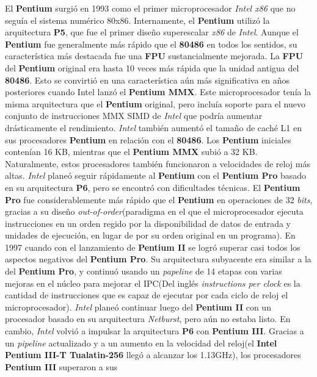 El \textbf{Pentium} surgió en 1993 como el primer microprocesador \emph{Intel x86} que no seguía el sistema numérico 80x86. Internamente, el \textbf{Pentium} utilizó 
la arquitectura \textbf{P5}, que fue el primer diseño superescalar \emph{x86} de \emph{Intel}. Aunque el \textbf{Pentium} fue generalmente más rápido que 
el \textbf{80486} en todos los sentidos, su característica más destacada fue una \textbf{FPU} sustancialmente mejorada. La \textbf{FPU} del \textbf{Pentium} original 
era hasta 10 veces más rápida que la unidad antigua del \textbf{80486}. Esto se convirtió en una característica aún más significativa en años posteriores cuando Intel 
lanzó el \textbf{Pentium MMX}. Este microprocesador tenía la misma arquitectura que el \textbf{Pentium} original, pero incluía soporte para el nuevo conjunto de instrucciones 
MMX SIMD de \emph{Intel} que podría aumentar drásticamente el rendimiento. \emph{Intel} también aumentó el tamaño de caché L1 en sus procesadores \textbf{Pentium} en relación con el \textbf{80486}. 
Los \textbf{Pentium} iniciales contenían 16 KB, mientras que el \textbf{Pentium MMX} subió a 32 KB. Naturalmente, estos procesadores también funcionaron a velocidades de reloj más altas. 
\emph{Intel} planeó seguir rápidamente al \textbf{Pentium} con el \textbf{Pentium Pro} basado en su arquitectura \textbf{P6}, pero se encontró con dificultades técnicas. El \textbf{Pentium Pro} 
fue considerablemente más rápido que el \textbf{Pentium} en operaciones de 32 \emph{bits}, gracias a su diseño \emph{out-of-order}(paradigma en el que el microprocesador ejecuta 
instrucciones en un orden regido por la disponibilidad de datos de entrada y unidades de ejecución, en lugar de por su orden original en un programa). En 1997 cuando con el lanzamiento de 
\textbf{Pentium II} se logró superar casi todos los aspectos negativos del \textbf{Pentium Pro}. Su arquitectura subyacente era similar a la del \textbf{Pentium Pro}, 
y continuó usando un \emph{papeline} de 14 etapas con varias mejoras en el núcleo para mejorar el IPC(Del inglés \emph{instructions per clock} es la cantidad de instrucciones que es 
capaz de ejecutar por cada ciclo de reloj el microprocesador). \emph{Intel} planeó continuar luego  del \textbf{Pentium II} con un procesador basado en su arquitectura \emph{Netburst}, 
pero aún no estaba listo. En cambio, \emph{Intel} volvió a impulsar la arquitectura \textbf{P6} con \textbf{Pentium III}. Gracias a un \emph{pipeline} actualizado y a un 
aumento en la velocidad del reloj(el \textbf{Intel Pentium III-T Tualatin-256} llegó a alcanzar los 1.13GHz), los procesadores \textbf{Pentium III} superaron a sus 

